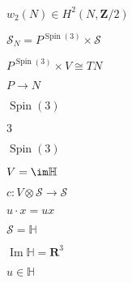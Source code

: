 \begin{preview}
\setcounter{equation}{0}%
\( w_2(N) \in H^2(N, \mathbf{Z} /2) \)
\end{preview}

\begin{preview}
\setcounter{equation}{0}%
\( \mathcal{S}_N = P^{\operatorname{Spin}(3)} \times \mathcal{S} \)
\end{preview}

\begin{preview}
\setcounter{equation}{0}%
\( P^{\operatorname{Spin}(3)} \times V\cong TN \)
\end{preview}

\begin{preview}
\setcounter{equation}{0}%
\( P \to N \)
\end{preview}

\begin{preview}
\setcounter{equation}{0}%
\( \operatorname{Spin}(3) \)
\end{preview}

\begin{preview}
\setcounter{equation}{0}%
\( 3 \)
\end{preview}

\begin{preview}
\setcounter{equation}{0}%
\( \operatorname{Spin}(3) \)
\end{preview}

\begin{preview}
\setcounter{equation}{0}%
\( V = \im \mathbb{H} \)
\end{preview}

\begin{preview}
\setcounter{equation}{0}%
\( c : V \otimes \mathcal{S}\to \mathcal{S} \)
\end{preview}

\begin{preview}
\setcounter{equation}{0}%
\( u\cdot x = ux \)
\end{preview}

\begin{preview}
\setcounter{equation}{0}%
\( \mathcal{S} = \mathbb{H} \)
\end{preview}

\begin{preview}
\setcounter{equation}{0}%
\( \operatorname{Im} \mathbb{H}  = \mathbf{R}^3 \)
\end{preview}

\begin{preview}
\setcounter{equation}{0}%
\( u\in \mathbb{H} \)
\end{preview}

